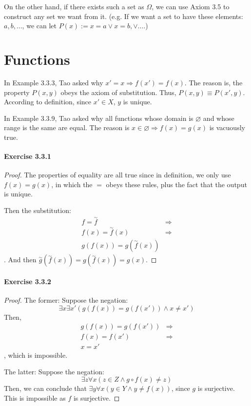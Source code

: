 On the other hand, if there exists such a set as $\Omega$, we can use Axiom 3.5 to construct any set 
we want from it. (e.g. If we want a set to have these elements: $a,b,\dots$, we can let 
$P(x):= x = a \vee x = b, \vee \dots$.)

\section{Functions}
In Example 3.3.3, Tao asked why $x'=x \Rightarrow f(x')=f(x)$. The reason is, the property $P(x,y)$ 
obeys the axiom of substitution. Thus, $P(x,y)\equiv P(x',y)$. According to definition, since 
$x' \in X$, $y$ is unique.

In Example 3.3.9, Tao asked why all functions whose domain is $\varnothing$ and whose range is the same 
are equal. The reason is $x \in \varnothing \Longrightarrow f(x) = g(x)$ is vacuously true.

\paragraph{Exercise 3.3.1} \label{exercise3.3.1}
\begin{proof}
The properties of equality are all true since in definition, we only use $f(x) = g(x)$, in which the $=$ 
obeys these rules, plus the fact that the output is unique.

Then the substitution:
\begin{align*}
f = \overset{\sim}{f} &\Longrightarrow \\
f(x) = \overset{\sim}{f}(x) &\Longrightarrow \\
g(f(x)) = g(\overset{\sim}{f}(x))
\end{align*}. 
And then $\overset{\sim}{g}(\overset{\sim}{f}(x)) = g(\overset{\sim}{f}(x)) = g(x)$.
\end{proof}

\paragraph{Exercise 3.3.2} \label{exercise3.3.2}
\begin{proof}
The former: Suppose the negation:
\[
\exists x \exists x'(g(f(x)) = g(f(x')) \wedge x \neq x')
\]
Then, 
\begin{align*}
g(f(x)) = g(f(x')) &\Longrightarrow \\
f(x)= f(x') \tag{$g$ is injective} &\Longrightarrow \\
x = x' \tag{$f$ is injective}
\end{align*}, 
which is impossible.

The latter: Suppose the negation:
\[
\exists z \forall x(z \in Z \wedge g \circ f(x) \neq z) 
\]
Then, we can conclude that $\exists y \forall x(y \in Y \wedge y \neq f(x))$, since $g$ is surjective. 
This is impossible as $f$ is surjective.
\end{proof}

